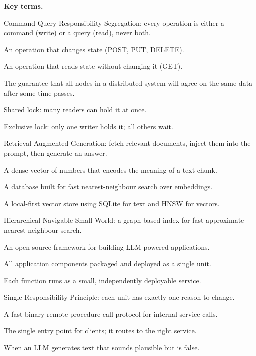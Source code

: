 \documentclass[a4paper,11pt]{article}
\begin{document}
\noindent\textbf{Key terms.}
\begin{description}[leftmargin=9.5em,style=nextline,font=\normalfont\bfseries\color{navy}]
  \item[CQRS] Command Query Responsibility Segregation: every operation is
    either a command (write) or a query (read), never both.
  \item[Command] An operation that changes state (POST, PUT, DELETE).
  \item[Query] An operation that reads state without changing it (GET).
  \item[Eventual consistency] The guarantee that all nodes in a distributed system will
    agree on the same data after some time passes.
  \item[S-lock] Shared lock: many readers can hold it at once.
  \item[X-lock] Exclusive lock: only one writer holds it; all others wait.
  \item[RAG] Retrieval-Augmented Generation: fetch relevant documents, inject them
    into the prompt, then generate an answer.
  \item[Embedding] A dense vector of numbers that encodes the meaning of a text chunk.
  \item[Vector store] A database built for fast nearest-neighbour search over embeddings.
  \item[ChromaDB] A local-first vector store using SQLite for text and HNSW for vectors.
  \item[HNSW] Hierarchical Navigable Small World: a graph-based index for fast approximate
    nearest-neighbour search.
  \item[LangChain] An open-source framework for building LLM-powered applications.
  \item[Monolith] All application components packaged and deployed as a single unit.
  \item[Microservices] Each function runs as a small, independently deployable service.
  \item[SRP] Single Responsibility Principle: each unit has exactly one reason to change.
  \item[gRPC] A fast binary remote procedure call protocol for internal service calls.
  \item[API Gateway] The single entry point for clients; it routes to the right service.
  \item[Hallucination] When an LLM generates text that sounds plausible but is false.
\end{description}
\end{document}
